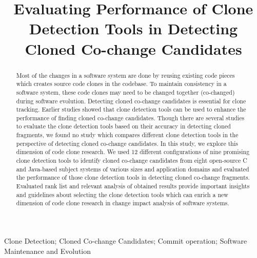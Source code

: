 \documentclass[review]{elsarticle}
\begin{document}
\begin{frontmatter}

\title{Evaluating Performance of Clone Detection Tools in Detecting Cloned Co-change Candidates}


\begin{abstract}
Most of the changes in a software system are done by reusing existing code pieces which creates source code clones in the codebase. To maintain consistency in a software system, these code clones may need to be changed together (co-changed) during software evolution. Detecting cloned co-change candidates is essential for clone tracking. Earlier studies showed that clone detection tools can be used to enhance the performance of finding cloned co-change candidates. Though there are several studies to evaluate the clone detection tools based on their accuracy in detecting cloned fragments, we found no study which compares different clone detection tools in the perspective of detecting cloned co-change candidates. In this study, we explore this dimension of code clone research. We used 12 different configurations of nine promising clone detection tools to identify cloned co-change candidates from eight open-source C and Java-based subject systems of various sizes and application domains and evaluated the performance of those clone detection tools in detecting cloned co-change fragments. Evaluated rank list and relevant analysis of obtained results provide important insights and guidelines about selecting the clone detection tools which can enrich a new dimension of code clone research in change impact analysis of software systems. 
\end{abstract}

\begin{keyword}
Clone Detection; Cloned Co-change Candidates; Commit operation; Software Maintenance and Evolution
\end{keyword}

\end{frontmatter}

\linenumbers
\end{document}
